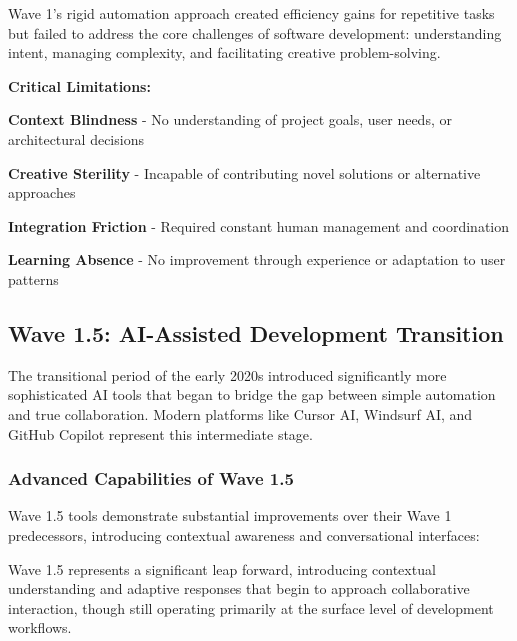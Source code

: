 \begin{alertbox}
Wave 1's rigid automation approach created efficiency gains for repetitive tasks but failed to address the core challenges of software development: understanding intent, managing complexity, and facilitating creative problem-solving.
\end{alertbox}

\textbf{Critical Limitations:}

\begin{expandedlist}
    \item \textbf{Context Blindness} - No understanding of project goals, user needs, or architectural decisions
    
    \item \textbf{Creative Sterility} - Incapable of contributing novel solutions or alternative approaches
    
    \item \textbf{Integration Friction} - Required constant human management and coordination
    
    \item \textbf{Learning Absence} - No improvement through experience or adaptation to user patterns
\end{expandedlist}

\subsection{Wave 1.5: AI-Assisted Development Transition}
\label{subsec:wave15-transition}

The transitional period of the early 2020s introduced significantly more sophisticated AI tools that began to bridge the gap between simple automation and true collaboration. Modern platforms like Cursor AI, Windsurf AI, and GitHub Copilot represent this intermediate stage.

\subsubsection{Advanced Capabilities of Wave 1.5}

Wave 1.5 tools demonstrate substantial improvements over their Wave 1 predecessors, introducing contextual awareness and conversational interfaces:

\begin{successbox}
Wave 1.5 represents a significant leap forward, introducing contextual understanding and adaptive responses that begin to approach collaborative interaction, though still operating primarily at the surface level of development workflows.
\end{successbox}

